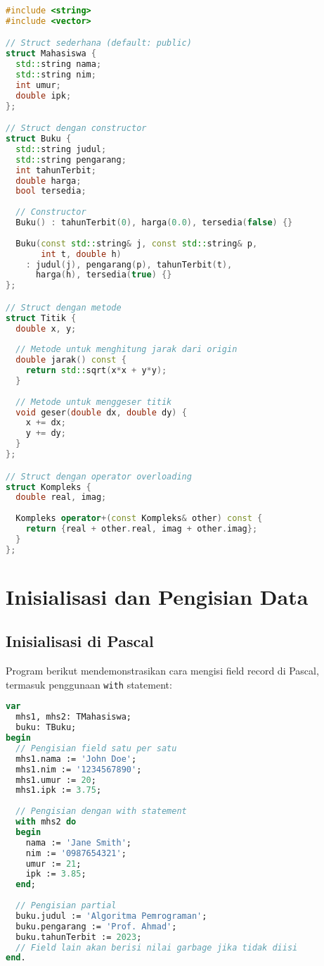 \documentclass[../main.tex]{subfiles}
\begin{document}
\begin{lstlisting}[language=C++, caption={Deklarasi struct di C++}]
#include <string>
#include <vector>

// Struct sederhana (default: public)
struct Mahasiswa {
  std::string nama;
  std::string nim;
  int umur;
  double ipk;
};

// Struct dengan constructor
struct Buku {
  std::string judul;
  std::string pengarang;
  int tahunTerbit;
  double harga;
  bool tersedia;
  
  // Constructor
  Buku() : tahunTerbit(0), harga(0.0), tersedia(false) {}
  
  Buku(const std::string& j, const std::string& p, 
       int t, double h) 
    : judul(j), pengarang(p), tahunTerbit(t), 
      harga(h), tersedia(true) {}
};

// Struct dengan metode
struct Titik {
  double x, y;
  
  // Metode untuk menghitung jarak dari origin
  double jarak() const {
    return std::sqrt(x*x + y*y);
  }
  
  // Metode untuk menggeser titik
  void geser(double dx, double dy) {
    x += dx;
    y += dy;
  }
};

// Struct dengan operator overloading
struct Kompleks {
  double real, imag;
  
  Kompleks operator+(const Kompleks& other) const {
    return {real + other.real, imag + other.imag};
  }
};
\end{lstlisting}

\section{Inisialisasi dan Pengisian Data}

\subsection{Inisialisasi di Pascal}

Program berikut mendemonstrasikan cara mengisi field record di Pascal, termasuk penggunaan \texttt{with} statement:

\begin{lstlisting}[language=Pascal, caption={Inisialisasi record di Pascal}]
var
  mhs1, mhs2: TMahasiswa;
  buku: TBuku;
begin
  // Pengisian field satu per satu
  mhs1.nama := 'John Doe';
  mhs1.nim := '1234567890';
  mhs1.umur := 20;
  mhs1.ipk := 3.75;
  
  // Pengisian dengan with statement
  with mhs2 do
  begin
    nama := 'Jane Smith';
    nim := '0987654321';
    umur := 21;
    ipk := 3.85;
  end;
  
  // Pengisian partial
  buku.judul := 'Algoritma Pemrograman';
  buku.pengarang := 'Prof. Ahmad';
  buku.tahunTerbit := 2023;
  // Field lain akan berisi nilai garbage jika tidak diisi
end.
\end{lstlisting}
\end{document}
